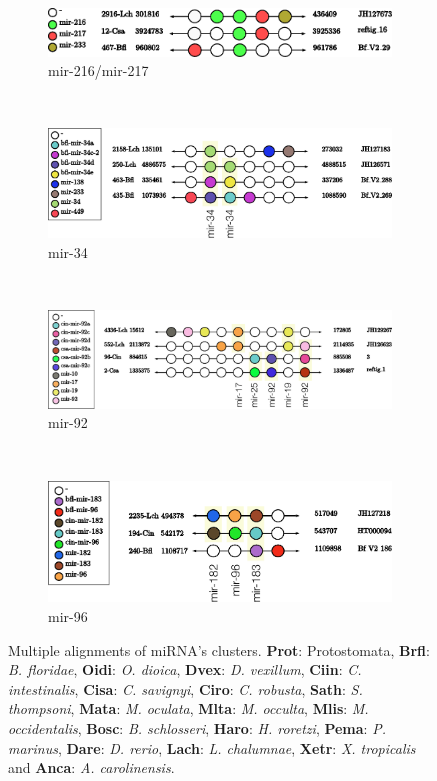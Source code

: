 \documentclass[graybox]{svmult}
\begin{document}
\begin{figure}[ht!]
    \\
    \begin{subfigure}[t]{0.45\textwidth}
        \centering
        \includegraphics[height=1.2 cm]{./Images/Cluster_images/mir-216_126_467}
        \caption{mir-216/mir-217}
       \end{subfigure}
     \\
    \begin{subfigure}[t]{0.45\textwidth}
        \centering
        \includegraphics[height=1.2 cm]{./Images/Cluster_images/mir-34_11A_435}
        \caption{mir-34}
       \end{subfigure}
        ~
         \begin{subfigure}[t]{0.45\textwidth}
        \centering
        \includegraphics[height=1.2 cm]{./Images/Cluster_images/mir-92_281_4336}
        \caption{mir-92}
    \end{subfigure}
    \\
    \begin{subfigure}[t]{1\textwidth}
        \centering
        \includegraphics[height=1.2 cm]{./Images/Cluster_images/mir-96_138_240}
        \caption{mir-96}
    \end{subfigure}
    \caption{Multiple alignments of miRNA's clusters. \textbf{Prot}: 
Protostomata, \textbf{Brfl}: \textit{B. floridae}, 
\textbf{Oidi}: \textit{O. dioica}, \textbf{Dvex}: \textit{D. vexillum}, 
\textbf{Ciin}: \textit{C. intestinalis}, \textbf{Cisa}: \textit{C. savignyi}, 
\textbf{Ciro}: \textit{C. robusta}, \textbf{Sath}: \textit{S. thompsoni}, 
\textbf{Mata}: \textit{M. oculata}, \textbf{Mlta}: \textit{M. occulta}, 
\textbf{Mlis}: \textit{M. occidentalis}, \textbf{Bosc}: \textit{B. schlosseri}, 
\textbf{Haro}: \textit{H. roretzi}, \textbf{Pema}: \textit{P. marinus}, 
\textbf{Dare}: \textit{D. rerio}, \textbf{Lach}: \textit{L. chalumnae}, 
\textbf{Xetr}: \textit{X. tropicalis} and \textbf{Anca}: \textit{A. 
carolinensis}.}
\end{figure}
\end{document}
